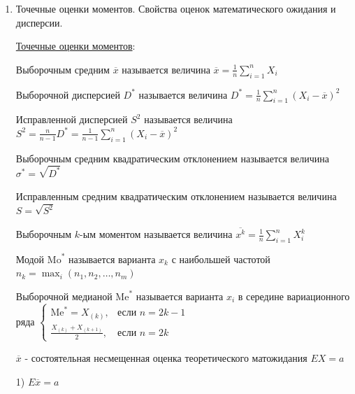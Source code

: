 \documentclass[12pt]{article}
\begin{document}
\begin{enumerate}
    \Notas Не существует эффективной оценки в классе всех возможных оценок

    \begin{MyTheorem}
        \Ths В классе несмещенных оценок существует эффективная оценка
    \end{MyTheorem}

    \Defs Оценка $\theta^*$ параметра $\theta$ называется асимптотически нормальной, если 
    $\sqrt{n} (\theta^* - \theta) \rightrightarrows N(0, \sigma^2 (\theta))$ при $n \to \infty$

    \item Точечные оценки моментов. Свойства оценок математического ожидания и дисперсии.

    \hyperlink{moments_point_estimation}{Точечные оценки моментов}:

    \Defs Выборочным средним $\overline{x}$ называется величина $\overline{x} = \frac{1}{n} \sum_{i = 1}^n X_i$

    \Defs Выборочной дисперсией $D^*$ называется величина $D^* = \frac{1}{n} \sum_{i = 1}^n (X_i - \overline{x})^2$

    \Defs Исправленной дисперсией $S^2$ называется величина $S^2 = \frac{n}{n - 1} D^* = \frac{1}{n - 1} \sum_{i = 1}^n (X_i - \overline{x})^2$

    \Defs Выборочным средним квадратическим отклонением называется величина $\sigma^* = \sqrt{D^*}$

    \Defs Исправленным средним квадратическим отклонением называется величина $S = \sqrt{S^2}$

    \Defs Выборочным $k$-ым моментом называется величина $\overline{x^k} = \frac{1}{n} \sum_{i = 1}^n X_i^k$

    \Defs Модой $\mathrm{Mo}^*$ называется варианта $x_k$ с наибольшей частотой $n_k = \max_i (n_1, n_2, \dots, n_m)$

    \Defs Выборочной медианой $\mathrm{Me}^*$ называется варианта $x_i$ в середине вариационного ряда $\begin{cases}\mathrm{Me}^* = 
    X_{(k)}, & \text{если } n = 2k - 1 \\ \frac{X_{(k)} + X_{(k + 1)}}{2}, & \text{если } n = 2k\end{cases}$
    
    \begin{MyTheorem}
        \Ths $\overline{x}$ - состоятельная несмещенная оценка теоретического матожидания $EX = a$
    
        1) $E \overline{x} = a$
    

\end{MyTheorem}
\end{enumerate}
\end{document}
